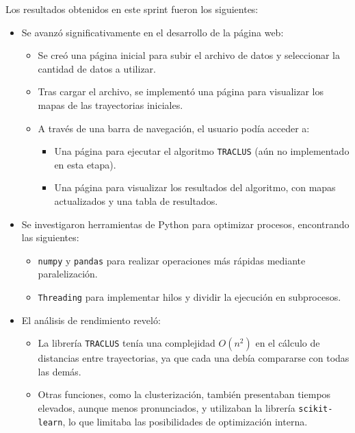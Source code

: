 Los resultados obtenidos en este sprint fueron los siguientes:

\begin{itemize}
    \item Se avanzó significativamente en el desarrollo de la página web:
        \begin{itemize}
            \item Se creó una página inicial para subir el archivo de datos y seleccionar la cantidad de datos a utilizar.
            \item Tras cargar el archivo, se implementó una página para visualizar los mapas de las trayectorias iniciales.
            \item A través de una barra de navegación, el usuario podía acceder a:
                \begin{itemize}
                    \item Una página para ejecutar el algoritmo \texttt{TRACLUS} (aún no implementado en esta etapa).
                    \item Una página para visualizar los resultados del algoritmo, con mapas actualizados y una tabla de resultados.
                \end{itemize}
        \end{itemize}

    \item Se investigaron herramientas de Python para optimizar procesos, encontrando las siguientes:
        \begin{itemize}
            \item \texttt{numpy} y \texttt{pandas} para realizar operaciones más rápidas mediante paralelización.
            \item \texttt{Threading} para implementar hilos y dividir la ejecución en subprocesos.
        \end{itemize}

    \item El análisis de rendimiento reveló:
        \begin{itemize}
            \item La librería \texttt{TRACLUS} tenía una complejidad \(O(n^2)\) en el cálculo de distancias entre trayectorias, ya que cada una debía compararse con todas las demás.
            \item Otras funciones, como la clusterización, también presentaban tiempos elevados, aunque menos pronunciados, y utilizaban la librería \texttt{scikit-learn}, lo que limitaba las posibilidades de optimización interna.
        \end{itemize}


\end{itemize}
